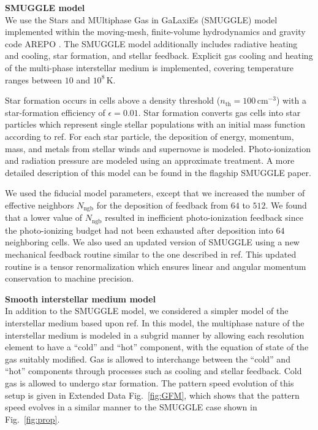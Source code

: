 \documentclass[twoside]{natureprintstyle}
\newcommand{\AREPO}{\textsc{AREPO}}
\begin{document}
\noindent
{\bf SMUGGLE model}
\\
\noindent
We use the Stars and MUltiphase Gas in GaLaxiEs (SMUGGLE) model
\cite{2019MNRAS.489.4233M} implemented within the moving-mesh, finite-volume
hydrodynamics and gravity code \AREPO{} \cite{2010MNRAS.401..791S}. The SMUGGLE model
additionally includes radiative heating and cooling, star
formation, and stellar feedback. Explicit gas cooling and heating of the
multi-phase interstellar medium is implemented, covering temperature ranges
between $10$ and $10^8\,\textrm{K}$.

Star formation occurs in cells above a density threshold
($n_{\textrm{th}}=100\,\textrm{cm}^{-3}$) with a star-formation efficiency of
$\epsilon = 0.01$. Star formation converts gas cells into star particles which
represent single stellar populations with an initial mass function according to ref.\cite{2001ApJ...554.1274C} For each star particle, the deposition
of energy, momentum, mass, and metals from stellar winds and supernovae is modeled.
Photo-ionization and radiation pressure are modeled using an approximate
treatment. A more detailed description of this model can be found in the
flagship SMUGGLE paper.\cite{2019MNRAS.489.4233M}

We used the fiducial model parameters, except that we increased the number of
effective neighbors $N_{\textrm{ngb}}$ for the deposition of feedback from
$64$ to $512$. We found that a lower value of $N_{\textrm{ngb}}$ resulted in
inefficient photo-ionization feedback since the photo-ionizing budget had not
been exhausted after deposition into $64$ neighboring cells. We also used an
updated version of SMUGGLE using a new mechanical feedback routine similar to
the one described in ref.\cite{2018MNRAS.480..800H} This updated routine is a
tensor renormalization which ensures linear and angular momentum conservation
to machine precision.

\vspace{12pt}

\noindent
{\bf Smooth interstellar medium model}
\\
\noindent
In addition to the SMUGGLE model, we considered a simpler model of the
interstellar medium based upon ref.\cite{2003MNRAS.339..289S} In this model,
the multiphase nature of the interstellar medium is modeled in a subgrid
manner by allowing each resolution element to have a ``cold'' and ``hot''
component, with the equation of state of the gas suitably modified. Gas is
allowed to interchange between the ``cold'' and ``hot'' components through
processes such as cooling and stellar feedback. Cold gas is allowed to undergo
star formation. The pattern speed evolution of this setup is given in Extended
Data Fig.~\ref{fig:GFM}, which shows that the pattern speed evolves in a
similar manner to the SMUGGLE case shown in Fig.~\ref{fig:prop}.
\end{document}
